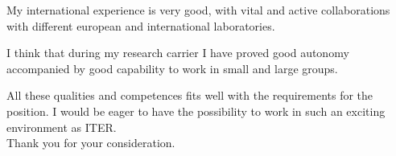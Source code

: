 \documentclass[12pt,stdletter,a4paper,dateno,sigleft]{newlfm}
\begin{document}
\begin{newlfm}
My international experience is very good, with vital and active
collaborations with different european and international laboratories. 

I think that during my research carrier I have proved good autonomy
accompanied by good capability to work in small and large groups. 

All these qualities and competences fits well with the
requirements for the position. I would be eager to have the possibility to work in such an exciting environment as ITER.\\
Thank you for your consideration. 

\end{newlfm}
\end{document}
